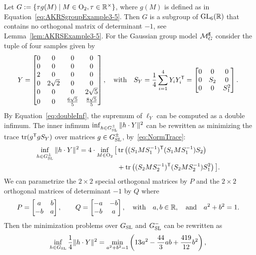 \begin{example} \label{ex:AKRS-Example3-5}
	Let $G := \left\lbrace \tau g(M) \mid M \in \operatorname{O}_2, \tau \in \mathbb R^{\times} \right\rbrace$, where $g(M)$ is defined as in Equation~\eqref{eq:AKRSgroupExample3-5}. Then $G$ is a subgroup of $\operatorname{GL}_6(\mathbb R)$ that contains no orthogonal matrix of determinant $-1$, see Lemma~\ref{lem:AKRSExample3-5}.
	For the Gaussian group model $\mathcal{M}^{\mathtt{g}}_G$ consider the tuple of four samples given by
	\[ Y = \begin{bmatrix} 0 & 0 & 0 & 0 \\ 0 & 0 & 0 & 0 \\ 2 & 0 & 0 & 0 \\ 0 & 2 \sqrt{2} & 0 & 0 \\ 0 & 0 & 0 & 2 \sqrt{5} \\ 0 & 0 & \frac{6 \sqrt{5}}{5} & \frac{8 \sqrt{5}}{5} \end{bmatrix}, \quad \text{with} \quad S_Y = \frac{1}{4} \sum_{i=1}^4 Y_i Y_i^{\mathsf{T}} = \begin{bmatrix} 0 & 0 & 0 \\ 0 & S_2 & 0 \\ 0 & 0 & S_1^2 \end{bmatrix} .\]
	By Equation~\eqref{eq:doubleInf}, the supremum of $\ell_Y$ can be computed as a double infimum. The inner infimum $\inf_{h \in G_{\operatorname{SL}}^{\pm}}  \| h \cdot Y \|^2$ can be rewritten as minimizing the trace $\operatorname{tr}(g^{\mathsf{T}} g S_Y)$ over matrices $g \in G_{\operatorname{SL}}^\pm$, by~\eqref{eq:NormTrace}:
		\begin{align*}
			\inf_{h \in G_{\operatorname{SL}}^{\pm}}  \| h \cdot Y \|^2 = 4 \cdot \inf_{M \in \operatorname{O}_2}  \big[ &\operatorname{tr} \left( (S_1 M S_1^{-1})^{\mathsf{T}} (S_1 M S_1^{-1}) S_2 \right) \\
			&+  \operatorname{tr} \left(( S_2 M S_2^{-1})^{\mathsf{T}} ( S_2 M S_2^{-1}) S_1^2 \right) \big].
		\end{align*}
	We can parametrize the $2 \times 2$ special orthogonal matrices by $P$ and the $2 \times 2$ orthogonal matrices of determinant $-1$ by $Q$ where
	\[ P = \begin{bmatrix} a & b \\ -b & a \end{bmatrix}, \qquad Q = \begin{bmatrix} -a & -b \\ -b & a \end{bmatrix}, \quad \text{with} \quad  a,b \in \mathbb R, \quad \text{and} \quad a^2 + b^2 = 1. \]
	Then the minimization problems over $G_{\operatorname{SL}}$ and $G_{\operatorname{SL}}^-$ can be rewritten as
	\[ \inf_{h \in G_{\operatorname{SL}}} \frac{1}{4} \| h \cdot Y \|^2 = \min_{ a^2+b^2=1} \left( 13 a^2 - \frac{44}{3} ab + \frac{419}{12} b^2 \right), \]

\end{example}
